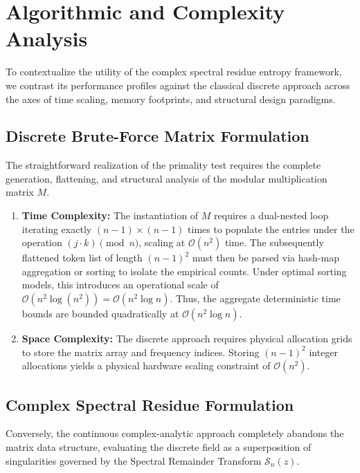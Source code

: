 \documentclass[11pt,twoside]{article}
\begin{document}
	\section{Algorithmic and Complexity Analysis}
	
	To contextualize the utility of the complex spectral residue entropy framework, we contrast its performance profiles against the classical discrete approach across the axes of time scaling, memory footprints, and structural design paradigms.
	
	\subsection{Discrete Brute-Force Matrix Formulation}
	The straightforward realization of the primality test requires the complete generation, flattening, and structural analysis of the modular multiplication matrix $M$. 
	
	\begin{enumerate}
		\item \textbf{Time Complexity:} The instantiation of $M$ requires a dual-nested loop iterating exactly $(n-1) \times (n-1)$ times to populate the entries under the operation $(j \cdot k) \pmod n$, scaling at $\mathcal{O}(n^2)$ time. The subsequently flattened token list of length $(n-1)^2$ must then be parsed via hash-map aggregation or sorting to isolate the empirical counts. Under optimal sorting models, this introduces an operational scale of $\mathcal{O}(n^2 \log(n^2)) = \mathcal{O}(n^2 \log n)$. Thus, the aggregate deterministic time bounds are bounded quadratically at $\mathcal{O}(n^2 \log n)$.
		\item \textbf{Space Complexity:} The discrete approach requires physical allocation grids to store the matrix array and frequency indices. Storing $(n-1)^2$ integer allocations yields a physical hardware scaling constraint of $\mathcal{O}(n^2)$.
	\end{enumerate}
	
	\subsection{Complex Spectral Residue Formulation}
	Conversely, the continuous complex-analytic approach completely abandons the matrix data structure, evaluating the discrete field as a superposition of singularities governed by the Spectral Remainder Transform $\mathcal{S}_n(z)$.
	
\end{document}
